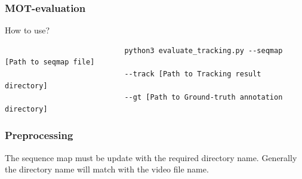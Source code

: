 					\subsubsection*{MOT-evaluation}
						How to use? 
						\begin{verbatim}
							python3 evaluate_tracking.py --seqmap [Path to seqmap file] 
							--track [Path to Tracking result directory] 
							--gt [Path to Ground-truth annotation directory]
						\end{verbatim}
						
					\subsubsection*{Preprocessing}
						The sequence map must be update with the required directory name. Generally the directory name will match with the video file name.

